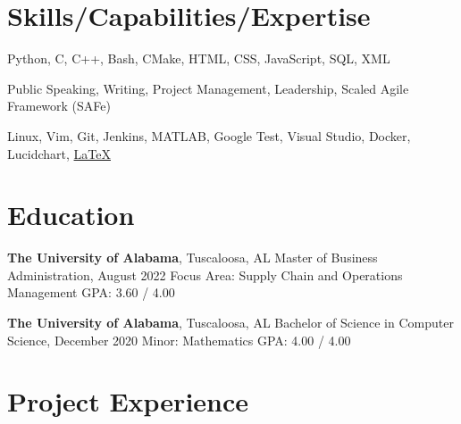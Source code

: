 \documentclass[hidelinks, 11pt]{article}
\begin{document}
\makecvtitle
\vspace{0.5mm}

\section{Skills/Capabilities/Expertise}

\begin{description}[widest=Programming Langauges:]
  \item[Programming Languages\normalfont:] Python, C, C++, Bash, CMake, HTML, CSS, JavaScript, SQL, XML
  \item[Soft Skills\normalfont:] Public Speaking, Writing, Project Management, Leadership, Scaled Agile Framework (SAFe)
  \item[Tools\normalfont:]	 Linux, Vim, Git, Jenkins, MATLAB, Google Test, Visual Studio, Docker, Lucidchart, \color{blue}\href{https://github.com/chwerth/LaTeX\_Resume}{LaTeX}
\end{description}

\section{Education}
\vspace{-1.4mm}
\begin{multicols}{2}

  \begin{minipage}{0.5\textwidth}
    \textbf{The University of Alabama}, Tuscaloosa, AL \newline
    Master of Business Administration, August 2022 \newline
    Focus Area: Supply Chain and Operations Management \newline
    GPA: 3.60 / 4.00
  \end{minipage}

  \begin{minipage}{0.5\textwidth}
    \textbf{The University of Alabama}, Tuscaloosa, AL \newline
    Bachelor of Science in Computer Science, December 2020 \newline
    Minor: Mathematics \newline
    GPA: 4.00 / 4.00
  \end{minipage}

\end{multicols}

\section{Project Experience}
\end{document}
